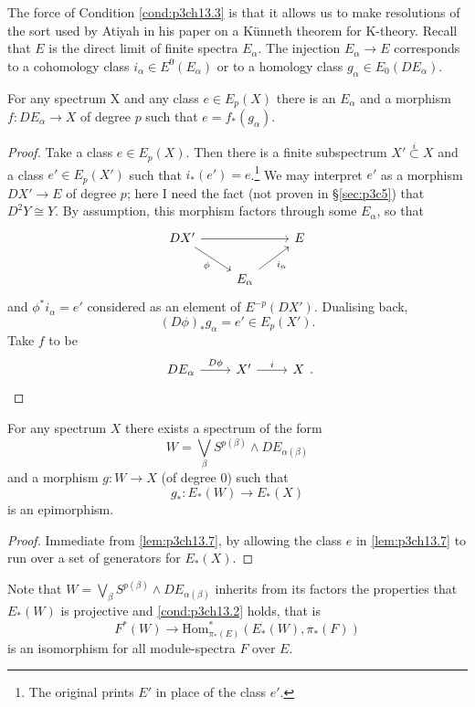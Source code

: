 \documentclass[../main]{subfiles}
\begin{document}
The force of Condition \ref{cond:p3ch13.3} is that it allows us to make resolutions of the sort used by Atiyah in his paper on a K\"{u}nneth theorem for K-theory. Recall that $E$ is the direct limit of finite spectra $E_\alpha$. The injection $E_\alpha \longrightarrow E$ corresponds to a cohomology class $i_\alpha \in E^0(E_\alpha)$ or to a homology class $g_\alpha \in E_0(DE_\alpha)$.
\begin{lemma}\label{lem:p3ch13.7}
For any spectrum X and any class $e \in E_p(X)$ there is an $E_\alpha$ and a morphism $f \colon DE_\alpha \longrightarrow X$ of degree $p$ such that $e = f_\ast(g_\alpha)$.
\end{lemma}
\begin{proof}
Take a class $e \in E_p(X)$. Then there is a finite subspectrum $X' \overset{i}{\subset} X$ and a class $e' \in E_p(X')$ such that $i_\ast(e') = e$.\footnote{The original prints $E'$ in place of the class $e'$.} We may interpret $e'$ as a morphism $DX' \longrightarrow E$ of degree $p$; here I need the fact (not proven in \S\ref{sec:p3c5}) that $D^2Y \cong Y$. By assumption, this morphism factors through some $E_\alpha$, so that 
\[\begin{tikzcd}
	{DX'} && E \\
	& {E_\alpha}
	\arrow["\phi"', from=1-1, to=2-2]
	\arrow["{i_\alpha}"', from=2-2, to=1-3]
	\arrow[from=1-1, to=1-3]
\end{tikzcd}\]
and $\phi^\ast i_\alpha = e'$ considered as an element of $E^{-p}(DX')$. Dualising back,
\[(D\phi)_\ast g_\alpha = e' \in E_p(X').\]
Take $f$ to be 
\[\begin{tikzcd} 
DE_\alpha & X' & {X} \arrow["D\phi", from=1-1, to=1-2]\arrow["i", from=1-2, to=1-3]
\end{tikzcd}.\]
\end{proof}
\begin{lemma}\label{lem:p3ch13.8}
For any spectrum $X$ there exists a spectrum of the form
\[W = \bigvee_{\beta}S^{p(\beta)}\wedge DE_{\alpha(\beta)}\]
and a morphism $g \colon W \longrightarrow X$ (of degree 0) such that
\[g_\ast \colon E_\ast(W) \longrightarrow E_\ast(X)\]
is an epimorphism.\end{lemma}
\begin{proof} Immediate from \ref{lem:p3ch13.7}, by allowing the class $e$ in \ref{lem:p3ch13.7} to run over a set of generators for $E_\ast(X)$.\end{proof}

Note that $W=\bigvee_{\beta}S^{p(\beta)}\wedge DE_{\alpha(\beta)}$ inherits from its factors the properties that $E_\ast(W)$ is projective and \ref{cond:p3ch13.2} holds, that is
\[F^\ast(W) \longrightarrow \text{Hom}^\ast_{\pi_\ast(E)}(E_\ast(W), \pi_\ast(F))\]
is an isomorphism for all module-spectra $F$ over $E$.
\end{document}
